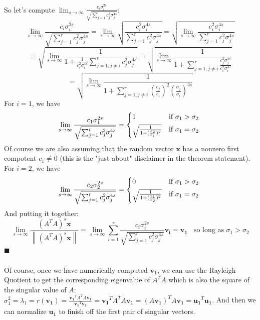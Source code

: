 \documentclass{tufte-handout}
\newcommand{\norm}[1]{\left\lVert#1\right\rVert}
\renewcommand{\qedsymbol}{$\blacksquare$}
\begin{document}
So let's compute $\lim_{s\rightarrow\infty}\frac{c_i\sigma_{i}^{2s}}{\sqrt{\sum_{j=1}^rc_j^2\sigma_{j}^{4s}}}$:
\[\lim_{s\rightarrow\infty}\frac{c_i\sigma_{i}^{2s}}{\sqrt{\sum_{j=1}^rc_j^2\sigma_{j}^{4s}}}
=
\lim_{s\rightarrow\infty}\sqrt{\frac{c_i^2\sigma_{i}^{4s}}{\sum_{j=1}^rc_j^2\sigma_{j}^{4s}}}
=
\sqrt{\lim_{s\rightarrow\infty}\frac{c_i^2\sigma_{i}^{4s}}{\sum_{j=1}^rc_j^2\sigma_{j}^{4s}}}
\]
\[
=
\sqrt{\lim_{s\rightarrow\infty}\frac{1}{1+\frac{1}{c_i^2\sigma_{i}^{4s}}\sum_{j=1,j\ne i}^rc_j^2\sigma_{j}^{4s}}}
=
\sqrt{\lim_{s\rightarrow\infty}\frac{1}{1+\sum_{j=1,j\ne i}^r\frac{c_j^2\sigma_{j}^{4s}}{c_i^2\sigma_{i}^{4s}}}}
\]
\[
=
\sqrt{\lim_{s\rightarrow\infty}\frac{1}{1+\sum_{j=1,j\ne i}^r(\frac{c_j}{c_i})^2(\frac{\sigma_{j}}{\sigma_{i}})^{4s}}}
\]
For $i=1$, we have
\[
\lim_{s\rightarrow\infty}\frac{c_1\sigma_{1}^{2s}}{\sqrt{\sum_{j=1}^rc_j^2\sigma_{j}^{4s}}}
=\begin{cases*}
1&if $\sigma_{1}>\sigma_{2}$\\
\sqrt{\frac{1}{1+(\frac{c_2}{c_1})^2}}&if $\sigma_{1}=\sigma_{2}$
\end{cases*}
\]
Of course we are also assuming that the random vector $\mathbf{x}$ has a nonzero first compotent $c_1\ne0$ (this is the "just about" disclaimer in the theorem statement). For $i=2$, we have
\[
\lim_{s\rightarrow\infty}\frac{c_2\sigma_{2}^{2s}}{\sqrt{\sum_{j=1}^rc_j^2\sigma_{j}^{4s}}}
=\begin{cases*}
0&if $\sigma_{1}>\sigma_{2}$\\
\sqrt{\frac{1}{1+(\frac{c_1}{c_2})^2}}&if $\sigma_{1}=\sigma_{2}$
\end{cases*}
\]
And putting it together:
\[
\lim_{s\rightarrow\infty}\frac{(A^TA)^s\mathbf{x}}{\norm{(A^TA)^s\mathbf{x}}}
=
\lim_{s\rightarrow\infty}\sum_{i=1}^r\frac{c_i\sigma_{i}^{2s}}{\sqrt{\sum_{j=1}^rc_j^2\sigma_{j}^{4s}}}\mathbf{v_i}
=\mathbf{v_1}~~~~\text{so long as }\sigma_{1}>\sigma_{2}
\]
\qedsymbol\\\leavevmode\\
\noindent Of course, once we have numerically computed $\mathbf{v_1}$, we can use the Rayleigh Quotient to get the corresponding eigenvalue of $A^TA$ which is also the square of the singular value of $A$: $\sigma_{1}^2=\lambda_1=r(\mathbf{v_1})=\frac{\mathbf{v_1
}^TA^TA\mathbf{v_1}}{\mathbf{v_1}^T\mathbf{v_1}}=\mathbf{v_1
}^TA^TA\mathbf{v_1}=(A\mathbf{v_1})^TA\mathbf{v_1}=\mathbf{u_1}^T\mathbf{u_1}$. And then we can normalize $\mathbf{u_1}$ to finish off the first pair of singular vectors.\\\leavevmode\\
\end{document}
